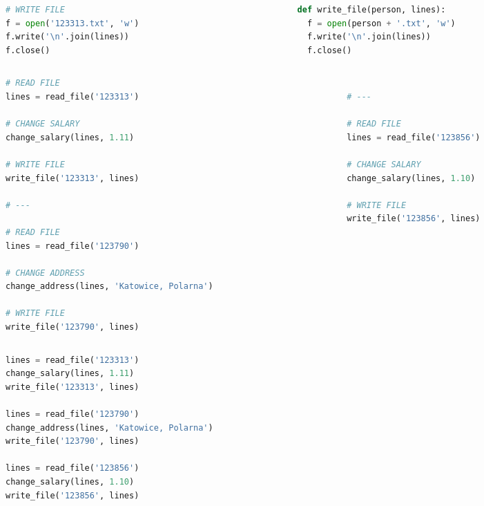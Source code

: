 \documentclass[aspectratio=169]{beamer}
\begin{document}
\begin{frame}[fragile]
\begin{columns}
\begin{column}{0.5\textwidth}
\begin{lstlisting}[basicstyle=\small,language=python]
# WRITE FILE
f = open('123313.txt', 'w')
f.write('\n'.join(lines))
f.close()
\end{lstlisting}
\end{column}
\begin{column}{0.5\textwidth}
\begin{lstlisting}[basicstyle=\small,language=python]
def write_file(person, lines):
  f = open(person + '.txt', 'w')
  f.write('\n'.join(lines))
  f.close()
\end{lstlisting}
\end{column}
\end{columns}
\end{frame}


\begin{frame}[fragile]
\begin{columns}
\begin{column}{0.5\textwidth}
\begin{lstlisting}[basicstyle=\tiny,language=python]
# READ FILE
lines = read_file('123313')

# CHANGE SALARY
change_salary(lines, 1.11)

# WRITE FILE
write_file('123313', lines)

# ---

# READ FILE
lines = read_file('123790')

# CHANGE ADDRESS
change_address(lines, 'Katowice, Polarna')

# WRITE FILE
write_file('123790', lines)
\end{lstlisting}
\end{column}
\begin{column}{0.5\textwidth}
\begin{lstlisting}[basicstyle=\tiny,language=python]

# ---

# READ FILE
lines = read_file('123856')

# CHANGE SALARY
change_salary(lines, 1.10)

# WRITE FILE
write_file('123856', lines)
\end{lstlisting}
\end{column}
\end{columns}
\end{frame}

\begin{frame}[fragile]
\begin{lstlisting}[language=python]
lines = read_file('123313')
change_salary(lines, 1.11)
write_file('123313', lines)

lines = read_file('123790')
change_address(lines, 'Katowice, Polarna')
write_file('123790', lines)

lines = read_file('123856')
change_salary(lines, 1.10)
write_file('123856', lines)
\end{lstlisting}
\end{frame}
\end{document}
